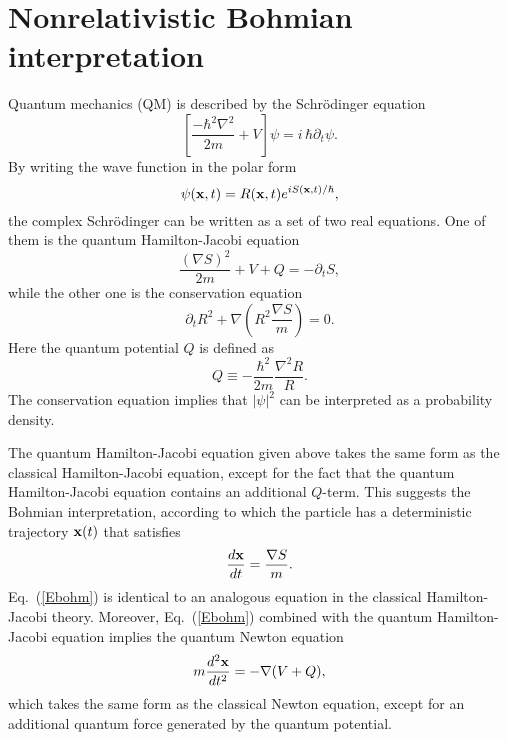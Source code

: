 \documentclass[10pt,twoside]{aipproc} %
\begin{document}
\section{Nonrelativistic Bohmian interpretation}

Quantum mechanics (QM) is described by the Schr\"odinger equation
\begin{equation}
\left[ \frac{-\hbar^2\nabla^2}{2m}+V \right] \psi=i\,\hbar\partial_t \psi .
\end{equation}
By writing the wave function in the polar form
\begin{equation} 
\psi({\bf x},t)=R({\bf x},t)e^{iS({\bf x},t)/\hbar},
\end{equation}
the complex Schr\"odinger can be written as a set of two 
real equations. One of them is the
quantum Hamilton-Jacobi equation
\begin{equation}
\frac{(\nabla S)^2}{2m}+V+Q=-\partial_tS ,
\end{equation}
while the other one is the conservation equation
\begin{equation}\label{cons}
\partial_t R^2 + \nabla\left( R^2\frac{\nabla S}{m} \right) =0 .
\end{equation}
Here the quantum potential $Q$ is defined as
\begin{equation}
Q\equiv -\frac{\hbar^2}{2m}\frac{\nabla^2 R}{R} .
\end{equation}
The conservation equation implies that $|\psi|^2$ 
can be interpreted as a probability density. 

The quantum Hamilton-Jacobi equation given above takes the same form as the 
classical Hamilton-Jacobi equation, except for the fact that 
the quantum Hamilton-Jacobi equation contains an additional $Q$-term.
This suggests the Bohmian interpretation, according to which 
the particle has a deterministic trajectory ${\bf x}(t)$ that 
satisfies
\begin{equation}\label{Ebohm}
\frac{d {\bf x}}{dt}=\frac{\nabla S}{m}.
\end{equation}
Eq.~(\ref{Ebohm}) is identical to an analogous equation 
in the classical Hamilton-Jacobi theory. Moreover, 
Eq.~(\ref{Ebohm}) combined with the quantum Hamilton-Jacobi equation
implies the quantum Newton equation
\begin{equation}
m\frac{d^2 {\bf x}}{dt^2}=-\nabla(V+Q),
\end{equation}
which takes the same form as the classical Newton equation, 
except for an additional quantum force generated by the 
quantum potential.  
\end{document}
